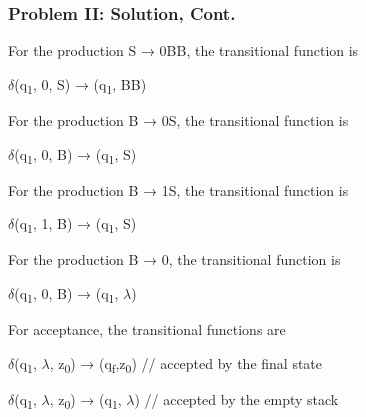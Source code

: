 \documentclass{beamer}
\begin{document}
	

\begin{frame}[fragile] %
	\frametitle{Problem II: Solution, Cont.}

For the production S → 0BB, the transitional function is

\begin{center}
	$\delta$(q\textsubscript{1}, 0, S) → (q\textsubscript{1}, BB)
\end{center}

For the production B → 0S, the transitional function is

\begin{center}
	$\delta$(q\textsubscript{1}, 0, B) → (q\textsubscript{1}, S)
\end{center}

For the production  B → 1S, the transitional function is

\begin{center}
	$\delta$(q\textsubscript{1}, 1, B) → (q\textsubscript{1}, S)
\end{center}

For the production B → 0, the transitional function is

\begin{center}
	$\delta$(q\textsubscript{1}, 0, B) → (q\textsubscript{1}, $\lambda$)
\end{center}

For acceptance, the transitional functions are

\begin{center}
	$\delta$(q\textsubscript{1}, $\lambda$, z\textsubscript{0}) → (q\textsubscript{f},z\textsubscript{0}) // accepted by the final state
\end{center}

\begin{center}
	$\delta$(q\textsubscript{1}, $\lambda$, z\textsubscript{0}) → (q\textsubscript{1}, $\lambda$) // accepted by the empty stack
\end{center}
\end{frame}


\end{document}
